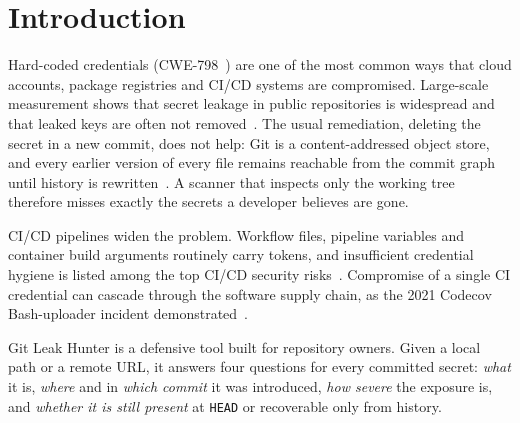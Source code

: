 \documentclass[conference]{IEEEtran}
\newcommand{\tool}{Git Leak Hunter}
\newcommand{\code}[1]{\texttt{#1}}
\begin{document}
\section{Introduction}

Hard-coded credentials (CWE-798~\cite{cwe798}) are one of the most common ways that cloud
accounts, package registries and CI/CD systems are compromised. Large-scale measurement shows that
secret leakage in public repositories is widespread and that leaked keys are often not
removed~\cite{meli2019}. The usual remediation, deleting the secret in a new commit, does not help:
Git is a content-addressed object store, and every earlier version of every file remains reachable
from the commit graph until history is rewritten~\cite{filterrepo}. A scanner that inspects only
the working tree therefore misses exactly the secrets a developer believes are gone.

CI/CD pipelines widen the problem. Workflow files, pipeline variables and container build
arguments routinely carry tokens, and insufficient credential hygiene is listed among the top
CI/CD security risks~\cite{owaspcicd}. Compromise of a single CI credential can cascade through
the software supply chain, as the 2021 Codecov Bash-uploader incident demonstrated~\cite{codecov}.

\tool{} is a defensive tool built for repository owners. Given a local path or a remote URL, it
answers four questions for every committed secret: \emph{what} it is, \emph{where} and in
\emph{which commit} it was introduced, \emph{how severe} the exposure is, and \emph{whether it is
still present} at \code{HEAD} or recoverable only from history.
\end{document}
